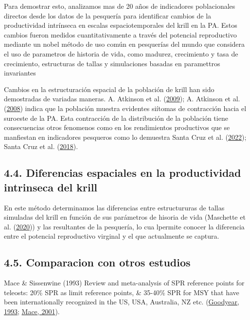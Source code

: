 \documentclass[
]{article}
\begin{document}
Para demostrar esto, analizamos mas de 20 años de indicadores
poblacionales directos desde los datos de la pesquería para identificar
cambios de la productividad intrínseca en escalas espaciotemporales del
krill en la PA. Estos cambios fueron medidos cuantitativamente a través
del potencial reproductivo mediante un nobel método de uso común en
pesquerías del mundo que considera el uso de parametros de historia de
vida, como madurez, crecimiento y tasa de crecimiento, estructuras de
tallas y simulaciones basadas en paramettros invariantes

Cambios en la estructuración espacial de la población de krill han sido
demostradas de variadas maneras. A. Atkinson et al.
(\protect\hyperlink{ref-Atkinson2009}{2009}); A. Atkinson et al.
(\protect\hyperlink{ref-Atkinson2008}{2008}) indica que la población
muestra evidentes siítomas de contracción hacia el suroeste de la PA.
Esta contracción de la distribución de la población tiene consecuencias
otros fenomenos como en los rendimientos productivos que se manfiestan
en indicadores pesqueros como lo demuestra Santa Cruz et al.
(\protect\hyperlink{ref-SantaCruz2022}{2022}); Santa Cruz et al.
(\protect\hyperlink{ref-SantaCruz2018}{2018}).

\hypertarget{diferencias-espaciales-en-la-productividad-intrinseca-del-krill}{%
\subsection{4.4. Diferencias espaciales en la productividad intrinseca
del
krill}\label{diferencias-espaciales-en-la-productividad-intrinseca-del-krill}}

En este método determinamos las diferencias entre estructururas de
tallas simuladas del krill en función de sus parámetros de hisoria de
vida (Maschette et al. (\protect\hyperlink{ref-Maschette2020}{2020})) y
las resultantes de la pesquería, lo cua lpermite conocer la diferencia
entre el potencial reproductivo virginal y el que actualmente se
captura.

\hypertarget{comparacion-con-otros-estudios}{%
\subsection{4.5. Comparacion con otros
estudios}\label{comparacion-con-otros-estudios}}

Mace \& Sissenwine (1993) Review and meta-analysis of SPR reference
points for teleosts: 20\% SPR as limit reference points, \& 35-40\% SPR
for MSY that have been internationally recognized in the US, USA,
Australia, NZ etc. (\protect\hyperlink{ref-Goodyear1993}{Goodyear,
1993}; \protect\hyperlink{ref-Mace2001}{Mace, 2001}).
\end{document}
